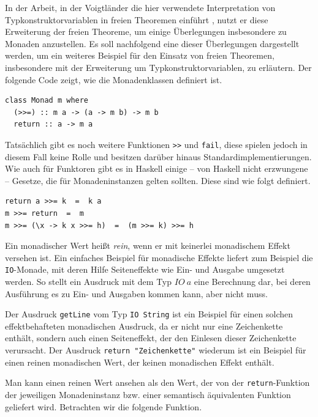
In der Arbeit, in der Voigtländer die hier verwendete Interpretation von Typkonstruktorvariablen in freien Theoremen
einführt \cite{voigtlander}, nutzt er diese Erweiterung der freien Theoreme, um einige Überlegungen insbesondere zu Monaden
anzustellen. Es soll nachfolgend eine dieser Überlegungen dargestellt werden, um ein weiteres Beispiel für den Einsatz von
freien Theoremen, insbesondere mit der Erweiterung um Typkonstruktorvariablen, zu erläutern.
Der folgende Code zeigt, wie die Monadenklassen definiert ist.

\begin{verbatim}
class Monad m where
  (>>=) :: m a -> (a -> m b) -> m b
  return :: a -> m a
\end{verbatim}

Tatsächlich gibt es noch weitere Funktionen \texttt{>>} und \texttt{fail}, diese spielen jedoch in diesem Fall keine Rolle und besitzen
darüber hinaus Standardimplementierungen. Wie auch für Funktoren gibt es in Haskell einige -- von Haskell nicht erzwungene -- Gesetze,
die für Monadeninstanzen gelten sollten. Diese sind wie folgt definiert.

\begin{verbatim}
return a >>= k  =  k a
m >>= return  =  m
m >>= (\x -> k x >>= h)  =  (m >>= k) >>= h
\end{verbatim}


Ein monadischer Wert heißt \textit{rein}, wenn er mit keinerlei monadischem Effekt versehen ist. Ein einfaches Beispiel für monadische
Effekte liefert zum Beispiel die \texttt{IO}-Monade, mit deren Hilfe Seiteneffekte wie Ein- und Ausgabe umgesetzt werden. So
stellt ein Ausdruck mit dem Typ $IO\ a$ eine Berechnung dar, bei deren Ausführung es zu Ein- und Ausgaben kommen kann, aber
nicht muss.

Der Ausdruck \texttt{getLine} vom Typ \texttt{IO String} ist ein Beispiel für einen solchen effektbehafteten monadischen Ausdruck, da
er nicht nur eine Zeichenkette enthält, sondern auch einen Seiteneffekt, der den Einlesen dieser Zeichenkette verursacht.
Der Ausdruck \texttt{return\ "Zeichenkette"} wiederum ist ein Beispiel für einen reinen monadischen Wert, der keinen monadischen
Effekt enthält.

Man kann einen reinen Wert ansehen als den Wert, der von der \texttt{return}-Funktion der jeweiligen Monadeninstanz
bzw. einer semantisch äquivalenten Funktion geliefert wird. Betrachten wir die folgende Funktion.

